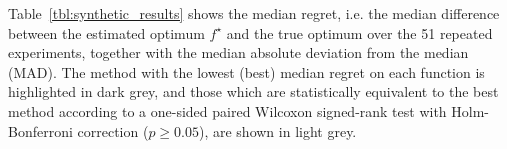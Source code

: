 \documentclass[
dvipsnames, table,   %
format=acmsmall,     %
anonymous=true,      %
authorversion=false, %
]{acmart}
\makeatletter
\newcommand{\fstar}{f^\star}
\newcommand*{\ie}{i.e.\@\xspace}
\makeatother
\begin{document}
Table~\ref{tbl:synthetic_results} shows the median regret, \ie the median
difference between the estimated optimum $\fstar$ and the true optimum %
over the 51 repeated experiments, together with the median
absolute deviation from the median (MAD). The method with the lowest (best)
median regret on each function is highlighted in dark grey, and those which are
statistically equivalent to the best method according to a one-sided paired 
Wilcoxon signed-rank test \citep{knowles:testing} with Holm-Bonferroni correction
\citep{holm:test} ($p\geq0.05$), are shown in light grey.
\end{document}
